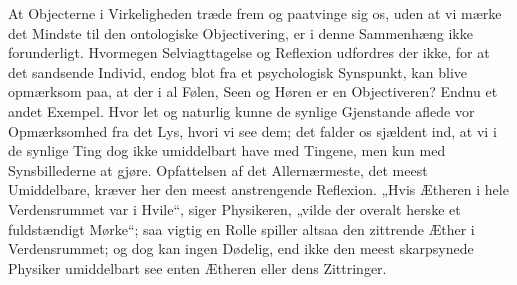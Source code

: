 \documentclass[12pt]{book}
\newcommand{\opage}[1]{\marginnote{\footnotesize\textit{[#1]}}}
\begin{document}
At Objecterne i Virkeligheden træde frem og paatvinge sig os, uden at vi mærke det Mindste til den
ontologiske Objectivering, er i denne Sammenhæng ikke forunderligt. Hvormegen Selviagttagelse og
Reflexion udfordres der ikke, for at det sandsende Individ, endog blot fra et psychologisk Synspunkt,
kan blive opmærksom paa, at der i al Følen, Seen og Høren er en Objectiveren? Endnu et andet Exempel.
Hvor let og naturlig kunne de synlige Gjenstande aflede vor Opmærksomhed fra det Lys, hvori vi see dem;
det falder os
\opage{270} sjældent ind, at vi i de synlige Ting dog ikke umiddelbart have med Tingene, men kun med Synsbillederne
at gjøre. Opfattelsen af det Allernærmeste, det meest Umiddelbare, kræver her den meest anstrengende
Reflexion. „Hvis Ætheren i hele Verdensrummet var i Hvile“, siger Physikeren, „vilde der overalt herske
et fuldstændigt Mørke“; saa vigtig en Rolle spiller altsaa den zittrende Æther i Verdensrummet; og dog
kan ingen Dødelig, end ikke den meest skarpsynede Physiker umiddelbart see enten Ætheren eller dens
Zittringer.
\end{document}
